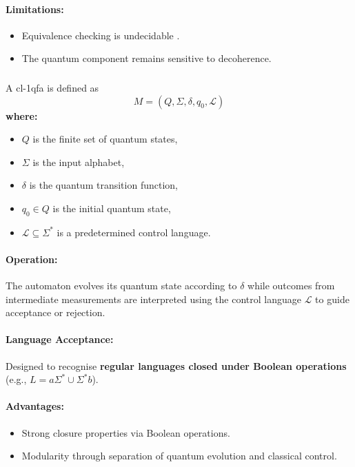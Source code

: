 \paragraph{Limitations:}
\begin{itemize}
    \item Equivalence checking is undecidable \cite{hirvensalo2008}.
    \item The quantum component remains sensitive to decoherence.
\end{itemize}
\cite{qiu2009}

\subsubsection{}
\label{subsec:cl-1qfa}
\begin{definition}
A \gls{cl-1qfa} is defined as 
\[
M = (Q, \Sigma, \delta, q_0, \mathcal{L})
\]
\textbf{where:}
\begin{itemize}
    \item \( Q \) is the finite set of quantum states,
    \item \( \Sigma \) is the input alphabet,
    \item \( \delta \) is the quantum transition function,
    \item \( q_0 \in Q \) is the initial quantum state,
    \item \( \mathcal{L} \subseteq \Sigma^* \) is a predetermined control language.
\end{itemize}
\end{definition}

\paragraph{Operation:}  
The automaton evolves its quantum state according to \( \delta \) while outcomes from intermediate measurements are interpreted using the control language \( \mathcal{L} \) to guide acceptance or rejection.

\paragraph{Language Acceptance:}  
Designed to recognise \textbf{regular languages closed under Boolean operations} (e.g., \( L = a\Sigma^* \cup \Sigma^* b \)).

\paragraph{Advantages:}
\begin{itemize}
    \item Strong closure properties via Boolean operations.
    \item Modularity through separation of quantum evolution and classical control.
\end{itemize}


